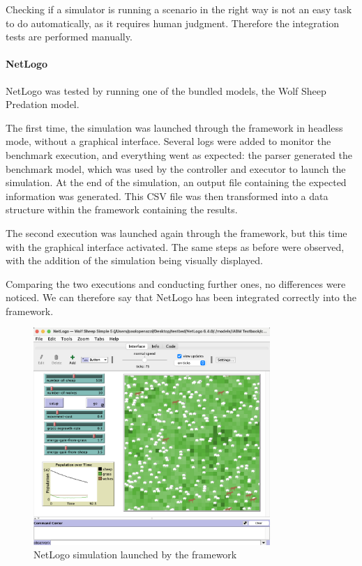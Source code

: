 \documentclass[12pt,a4paper,openright,twoside]{book}
\begin{document}
Checking if a simulator is running a scenario in the right way is not an easy task to do automatically, as it requires human judgment.
Therefore the integration tests are performed manually.

\paragraph*{NetLogo}
NetLogo was tested by running one of the bundled models, the Wolf Sheep Predation model.

The first time, the simulation was launched through the framework in headless mode, without a graphical interface.
Several logs were added to monitor the benchmark execution, and everything went as expected:
the parser generated the benchmark model, which was used by the controller and executor to launch the simulation.
At the end of the simulation, an output file containing the expected information was generated.
This CSV file was then transformed into a data structure within the framework containing the results.

The second execution was launched again through the framework, but this time with the graphical interface activated. 
The same steps as before were observed, with the addition of the simulation being visually displayed.

Comparing the two executions and conducting further ones, no differences were noticed. 
We can therefore say that NetLogo has been integrated correctly into the framework.

\begin{figure}[H]
  \centering
  \includegraphics[width=0.8\textwidth]{figures/netlogo-sim.png}
  \caption{NetLogo simulation launched by the framework}
\end{figure}
\end{document}
